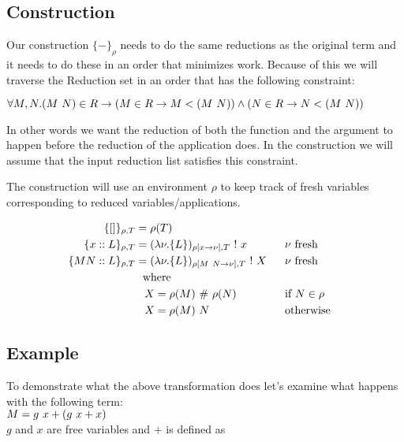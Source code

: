 \documentclass[a4paper]{article}
\begin{document}
\subsection{Construction}

\newcommand{\constr}[1]{\{#1\}}

Our construction $\constr{-}_{\rho}$ needs to do the same reductions as the original term and it needs to do these in an order that minimizes work. Because of this we will traverse the Reduction set in an order that has the following constraint:

$\forall M, N. (M \  N) \in R \to (M \in R \to M < (M \  N)) \land (N \in R \to N < (M \  N))$

In other words we want the reduction of both the function and the argument to happen before the reduction of the application does. In the construction we will assume that the input reduction list satisfies this constraint.

The construction will use an environment $\rho$ to keep track of fresh variables corresponding to reduced variables/applications.

\begin{align*}
  \constr{[]}_{\rho, T} &= \rho(T)\\
  \constr{x :: L}_{\rho, T} &= (\lambda \nu. \constr{L})_{\rho[x\to\nu], T} \strict x && \text{$\nu$ fresh}\\
  \constr{M N :: L}_{\rho, T} &= (\lambda \nu. \constr{L})_{\rho[M \app N \to\nu], T} \strict X && \text{$\nu$ fresh}\\
  & \text{where}\\
  & \;\;\; X = \rho(M) \unboxed \rho(N) && \text{if $N \in \rho$}\\
  & \;\;\; X = \rho(M) \app N && \text{otherwise}\\
\end{align*}

\subsection{Example}

To demonstrate what the above transformation does let's examine what happens with the following term:\\

$M = g \  x + (g \  x + x)$\\

$g$ and $x$ are free variables and $+$ is defined as\\
\end{document}
